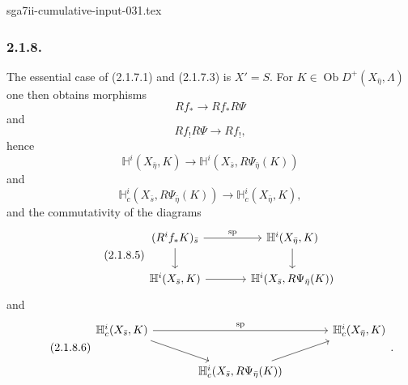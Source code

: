 \begin{filecontents*}{sga7ii-cumulative-input-031.tex}
\subsubsection*{2.1.8.}
The essential case of (2.1.7.1) and (2.1.7.3) is $X'=S$.  For
$K\in\operatorname{Ob}D^+(X_{\bar\eta},\Lambda)$ one then obtains
morphisms
\begin{equation}\tag{2.1.8.1}
Rf_*\longrightarrow Rf_*R\Psi
\end{equation}
and
\begin{equation}\tag{2.1.8.2}
Rf_!R\Psi\longrightarrow Rf_!,
\end{equation}
hence
\begin{equation}\tag{2.1.8.3}
\mathbb H^i(X_{\bar\eta},K)
\longrightarrow
\mathbb H^i(X_{\bar s},R\Psi_{\bar\eta}(K))
\end{equation}
and
\begin{equation}\tag{2.1.8.4}
\mathbb H_c^i(X_{\bar s},R\Psi_{\bar\eta}(K))
\longrightarrow
\mathbb H_c^i(X_{\bar\eta},K),
\end{equation}
and the commutativity of the diagrams
\begin{equation}\tag{2.1.8.5}
\begin{tikzcd}[column sep=large]
(R^if_*K)_{\bar s} \arrow[r, "\mathrm{sp}"] \arrow[d]
  & \mathbb H^i(X_{\bar\eta},K) \arrow[d] \\
\mathbb H^i(X_{\bar s},K) \arrow[r]
  & \mathbb H^i(X_{\bar s},R\Psi_{\bar\eta}(K))
\end{tikzcd}
\end{equation}
and
\begin{equation}\tag{2.1.8.6}
\begin{tikzcd}[column sep=large]
\mathbb H_c^i(X_{\bar s},K) \arrow[rr, "\mathrm{sp}"] \arrow[dr]
  & {} & \mathbb H_c^i(X_{\bar\eta},K) \\
{} & \mathbb H_c^i(X_{\bar s},R\Psi_{\bar\eta}(K)) \arrow[ur] & {}
\end{tikzcd}
.\end{equation}


\end{filecontents*}
